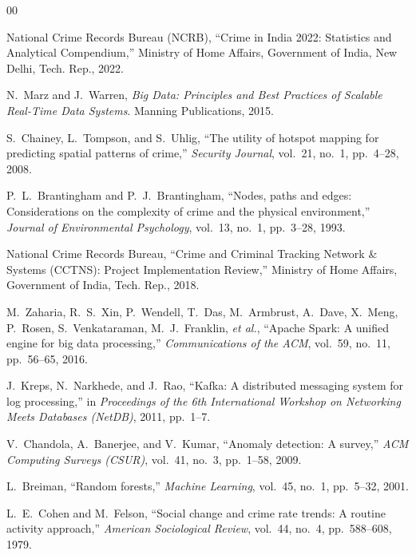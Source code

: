 \documentclass[conference]{IEEEtran}
\begin{document}
\begin{thebibliography}{00}

National Crime Records Bureau (NCRB), ``Crime in India 2022: Statistics and Analytical Compendium,'' Ministry of Home Affairs, Government of India, New Delhi, Tech. Rep., 2022.

N.~Marz and J.~Warren, \emph{Big Data: Principles and Best Practices of Scalable Real-Time Data Systems}. Manning Publications, 2015.

S.~Chainey, L.~Tompson, and S.~Uhlig, ``The utility of hotspot mapping for predicting spatial patterns of crime,'' \emph{Security Journal}, vol.~21, no.~1, pp.~4--28, 2008.

P.~L.~Brantingham and P.~J.~Brantingham, ``Nodes, paths and edges: Considerations on the complexity of crime and the physical environment,'' \emph{Journal of Environmental Psychology}, vol.~13, no.~1, pp.~3--28, 1993.

National Crime Records Bureau, ``Crime and Criminal Tracking Network \& Systems (CCTNS): Project Implementation Review,'' Ministry of Home Affairs, Government of India, Tech. Rep., 2018.

M.~Zaharia, R.~S.~Xin, P.~Wendell, T.~Das, M.~Armbrust, A.~Dave, X.~Meng, P.~Rosen, S.~Venkataraman, M.~J.~Franklin, \emph{et al.}, ``Apache Spark: A unified engine for big data processing,'' \emph{Communications of the ACM}, vol.~59, no.~11, pp.~56--65, 2016.

J.~Kreps, N.~Narkhede, and J.~Rao, ``Kafka: A distributed messaging system for log processing,'' in \emph{Proceedings of the 6th International Workshop on Networking Meets Databases (NetDB)}, 2011, pp.~1--7.

V.~Chandola, A.~Banerjee, and V.~Kumar, ``Anomaly detection: A survey,'' \emph{ACM Computing Surveys (CSUR)}, vol.~41, no.~3, pp.~1--58, 2009.

L.~Breiman, ``Random forests,'' \emph{Machine Learning}, vol.~45, no.~1, pp.~5--32, 2001.

L.~E.~Cohen and M.~Felson, ``Social change and crime rate trends: A routine activity approach,'' \emph{American Sociological Review}, vol.~44, no.~4, pp.~588--608, 1979.

\end{thebibliography}
\end{document}
